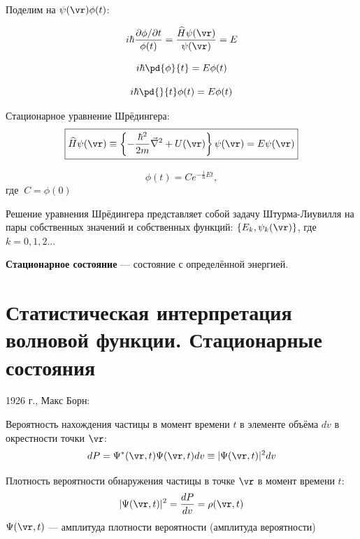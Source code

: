 Поделим на $\psi(\vr)\phi(t)$:

$$i \hbar \frac{\partial \phi / \partial t}{\phi(t)} = \frac{\widehat{H} \psi(\vr)}{\psi(\vr)} = E$$

\begin{equation}
\label{eq:1_3_4}
i \hbar \pd{\phi}{t} = E \phi(t)
\end{equation}

\begin{equation}
\label{eq:1_3_5}
i \hbar \pd{}{t} \phi(t) = E \phi(t)
\end{equation}

Стационарное уравнение Шрёдингера:
\begin{equation}
\label{eq:1_3_6}
\boxed{\widehat{H} \psi(\vr) \equiv \left\{ -\frac{\hbar^2}{2m} \vec{\nabla}^2 + U(\vr) \right\}\psi(\vr) = E\psi(\vr)}
\end{equation}

$$\phi(t)=C e^{-\frac{i}{\hbar}Et},$$
где $~C=\phi(0)$

Решение уравнения Шрёдингера представляет собой задачу Штурма-Лиувилля на пары собственных значений и собственных функций: $\{E_k, \psi_k(\vr)\}$, где $k=0,1,2...$

\textbf{Стационарное состояние} --- состояние с определённой энергией.

\begin{sloppypar}
  \section{Статистическая интерпретация волновой функции. Стационарные состояния}
\end{sloppypar}

1926 г., Макс Борн: 

\begin{defn}
Вероятность нахождения частицы в момент времени $t$ в элементе объёма $dv$ в окрестности точки $\vr$:
\begin{equation}
\label{eq:1_4_1}
dP = \Psi^*(\vr,t) \Psi(\vr,t) dv \equiv|\Psi(\vr,t)|^2dv
\end{equation}
\end{defn}

\begin{defn}
Плотность вероятности обнаружения частицы в точке $\vr$ в момент времени $t$:
\begin{equation}
\label{eq:1_4_2}
|\Psi(\vr,t)|^2 = \frac{dP}{dv} = \rho(\vr,t)
\end{equation}
$\Psi(\vr,t)$ --- амплитуда плотности вероятности (амплитуда вероятности)
\end{defn}



